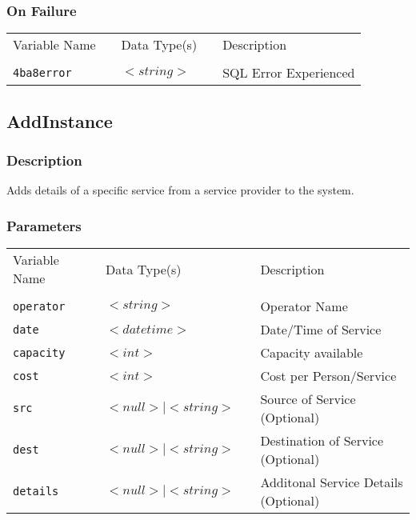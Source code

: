 \subsubsection{On Failure}

\begin{tabular}{lllll}
Variable Name	&		&	Data Type(s)		&	&	Description	\\
				&	&	&	&	\\
\verb!4ba8error! & \hspace{15mm} & $<string>$ & \hspace{15mm} & SQL Error Experienced \\
\end{tabular}


\subsection{AddInstance}

\subsubsection{Description}

Adds details of a specific service from a service provider to the
system.  

\subsubsection{Parameters}

\begin{tabular}{lllll}
Variable Name	&		&	Data Type(s)		&	&	Description	\\
				&	&	&	&	\\
\verb!operator! & \hspace{15mm} & $<string>$ 	& \hspace{15mm} & Operator Name \\
\verb!date! 	 & \hspace{15mm} & $<datetime>$ & \hspace{15mm} & Date/Time of Service\\
\verb!capacity! & \hspace{15mm} & $<int>$ 		& \hspace{15mm} & Capacity available \\
\verb!cost! 	 & \hspace{15mm} & $<int>$ 		& \hspace{15mm} & Cost per Person/Service \\
\verb!src! 		 & \hspace{15mm} & $<null> \mid <string>$ & \hspace{15mm} & Source of Service (Optional) \\
\verb!dest! 	 & \hspace{15mm} & $<null> \mid <string>$ & \hspace{15mm} & Destination of Service (Optional) \\
\verb!details!  & \hspace{15mm} & $<null> \mid <string>$ & \hspace{15mm} & Additonal Service Details (Optional) \\
\end{tabular}

